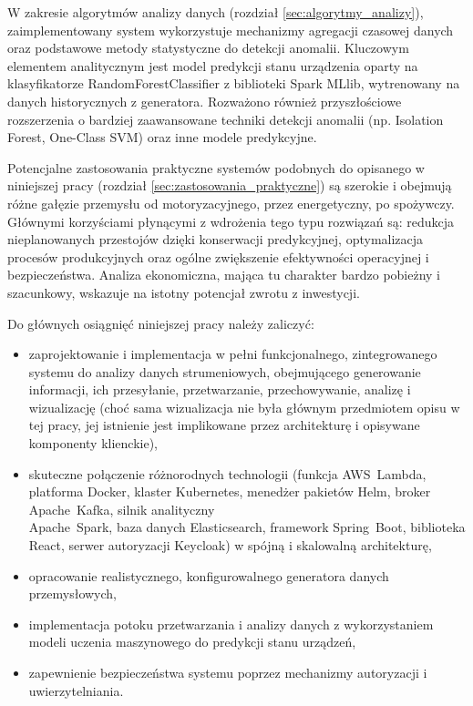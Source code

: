 W zakresie algorytmów analizy danych (rozdział \ref{sec:algorytmy_analizy}), zaimplementowany system wykorzystuje mechanizmy agregacji czasowej danych oraz podstawowe metody statystyczne do detekcji anomalii. Kluczowym elementem analitycznym jest model predykcji stanu urządzenia oparty na klasyfikatorze \mbox{RandomForestClassifier} z biblioteki Spark MLlib, wytrenowany na danych historycznych z generatora. Rozważono również przyszłościowe rozszerzenia o bardziej zaawansowane techniki detekcji anomalii (np. Isolation Forest, One-Class SVM) oraz inne modele predykcyjne.

Potencjalne zastosowania praktyczne systemów podobnych do opisanego w niniejszej pracy (rozdział \ref{sec:zastosowania_praktyczne}) są szerokie i obejmują różne gałęzie przemysłu od motoryzacyjnego, przez energetyczny, po spożywczy. Głównymi korzyściami płynącymi z wdrożenia tego typu rozwiązań są: redukcja nieplanowanych przestojów dzięki konserwacji predykcyjnej, optymalizacja procesów produkcyjnych oraz ogólne zwiększenie efektywności operacyjnej i bezpieczeństwa. Analiza ekonomiczna, mająca tu charakter bardzo pobieżny i szacunkowy, wskazuje na istotny potencjał zwrotu z inwestycji.

\vspace{0.3em}

Do głównych osiągnięć niniejszej pracy należy zaliczyć:
\begin{itemize}
    \item zaprojektowanie i implementacja w pełni funkcjonalnego, zintegrowanego systemu do analizy danych  strumeniowych, obejmującego generowanie informacji, ich przesyłanie, przetwarzanie, przechowywanie, analizę i wizualizację (choć sama wizualizacja nie była głównym przedmiotem opisu w tej pracy, jej istnienie jest implikowane przez architekturę i opisywane komponenty klienckie),
    \item skuteczne połączenie różnorodnych technologii (funkcja \mbox{AWS Lambda}, platforma Docker, klaster Kubernetes, menedżer pakietów Helm, broker \mbox{Apache Kafka}, silnik analityczny \\ \mbox{Apache Spark}, baza danych Elasticsearch, framework \mbox{Spring Boot}, biblioteka React, serwer autoryzacji Keycloak) w spójną i skalowalną architekturę,
    \item opracowanie realistycznego, konfigurowalnego generatora danych przemysłowych,
    \item implementacja potoku przetwarzania i analizy danych z wykorzystaniem modeli uczenia maszynowego do predykcji stanu urządzeń,
    \item zapewnienie bezpieczeństwa systemu poprzez mechanizmy autoryzacji i uwierzytelniania.
\end{itemize}


